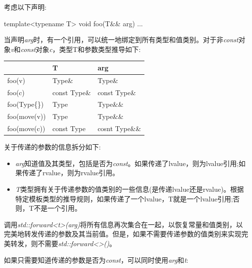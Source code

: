 考虑以下声明:\par

\begin{codebox}[cpp]
template<typename T>
void foo(T&& arg) {
  ...
}
\end{codebox}

当声明\textit{arg}时，有一个引用，可以统一地绑定到所有类型和值类别。对于非\textit{const}对象\textit{v}和\textit{const}对象\textit{c}，类型T和参数类型推导如下:\par

\begin{center}
  \begin{tabular}{lll}
	\toprule
    & T            & arg            \\
	\midrule
    foo(v)        & Type\&       & Type\&         \\
    foo(c)        & const Type\& & const Type\&   \\
    foo(Type\{\}) & Type         & Type\&\&       \\
    foo(move(v))  & Type         & Type\&\&       \\
    foo(move(c))  & const Type   & cosnt Type\&\&
  \end{tabular}
\end{center}

关于传递的参数的信息拆分如下:\par

\begin{itemize}
  \item \textit{arg}知道值及其类型，包括是否为\textit{const}。如果传递了lvalue，则为lvalue引用;如果传递了rvalue，则为rvalue引用。
  \item \textit{T}类型拥有关于传递参数的值类别的一些信息(是传递lvalue还是rvalue)。根据特定模板类型的推导规则，如果传递了一个lvalue，T就是一个lvalue引用;否则，T不是一个引用。
\end{itemize}

调用\textit{std::\allowbreak{}forward<\allowbreak{}t>(\allowbreak{}arg)\allowbreak{}}将所有信息再次集合在一起，以恢复常量和值类别，以完美地转发传递的参数及其当前值。但是，如果不需要传递参数的值类别来实现完美转发，则不需要\textit{std::\allowbreak{}forward<\allowbreak{}>(\allowbreak{})\allowbreak{}}。\par


如果只需要知道传递的参数是否为\textit{const}，可以同时使用\textit{arg}和\textit{t}:\par

